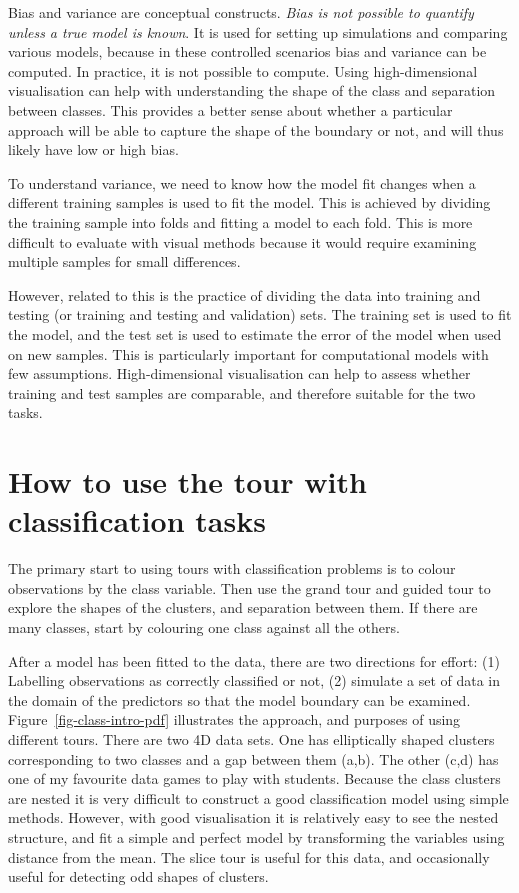 \documentclass[
  letterpaper,
]{krantz}
\begin{document}
Bias and variance are conceptual constructs. \emph{Bias is not possible
to quantify unless a true model is known}. It is used for setting up
simulations and comparing various models, because in these controlled
scenarios bias and variance can be computed. In practice, it is not
possible to compute. Using high-dimensional visualisation can help with
understanding the shape of the class and separation between classes.
This provides a better sense about whether a particular approach will be
able to capture the shape of the boundary or not, and will thus likely
have low or high bias.

To understand variance, we need to know how the model fit changes when a
different training samples is used to fit the model. This is achieved by
dividing the training sample into folds and fitting a model to each
fold. This is more difficult to evaluate with visual methods because it
would require examining multiple samples for small differences.

However, related to this is the practice of dividing the data into
training and testing (or training and testing and validation) sets. The
training set is used to fit the model, and the test set is used to
estimate the error of the model when used on new samples. This is
particularly important for computational models with few assumptions.
High-dimensional visualisation can help to assess whether training and
test samples are comparable, and therefore suitable for the two tasks.

\section{How to use the tour with classification
tasks}\label{how-to-use-the-tour-with-classification-tasks}

The primary start to using tours with classification problems is to
colour observations by the class variable. Then use the grand tour and
guided tour to explore the shapes of the clusters, and separation
between them. If there are many classes, start by colouring one class
against all the others. 

After a model has been fitted to the data, there are two directions for
effort: (1) Labelling observations as correctly classified or not, (2)
simulate a set of data in the domain of the predictors so that the model
boundary can be examined. Figure~\ref{fig-class-intro-pdf} illustrates
the approach, and purposes of using different tours. There are two 4D
data sets. One has elliptically shaped clusters corresponding to two
classes and a gap between them (a,b). The other (c,d) has one of my
favourite data games to play with students. Because the class clusters
are nested it is very difficult to construct a good classification model
using simple methods. However, with good visualisation it is relatively
easy to see the nested structure, and fit a simple and perfect model by
transforming the variables using distance from the mean. The slice tour
is useful for this data, and occasionally useful for detecting odd
shapes of clusters.
\end{document}
